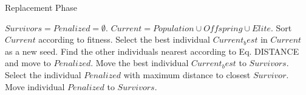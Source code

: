\begin{algorithm}[H]
  \scriptsize
	\caption{Replacement Phase} 
	\begin{algorithmic}[1]
	\STATE $Survivors = Penalized = \emptyset$.
	\STATE $Current = Population \cup Offspring \cup Elite$.
	\STATE Sort $Current$ according to fitness.
	   \STATE Select the best individual $Current_best$ in $Current$ as a new seed.
	   \STATE Find the other individuals nearest according to Eq. DISTANCE and move to $Penalized$.
	   \STATE Move the best individual $Current_best$ to $Survivors$.
	\ENDWHILE
	   \STATE Select the individual $Penalized$ with maximum distance to closest $Survivor$.
	   \STATE Move individual $Penalized$ to $Survivors$.
	\ENDWHILE
    \label{alg:Fase_Remplazo_VSD-MOEAD}
\end{algorithmic}
\end{algorithm}


